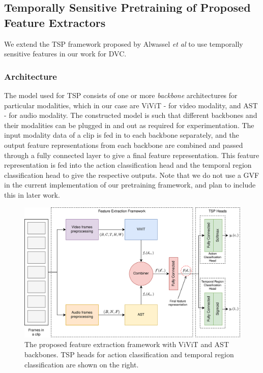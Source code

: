 \subsection{Temporally Sensitive Pretraining of Proposed Feature Extractors}

\par We extend the TSP framework proposed by Alwassel \textit{et al} \cite{alwassel2021tsp} to use temporally sensitive features in our work for DVC.

\subsubsection{Architecture} The model used for TSP consists of one or more \textit{backbone} architectures for particular modalities, which in our case are ViViT - for video modality, and AST - for audio modality. The constructed model is such that different backbones and their modalities can be plugged in and out as required for experimentation. The input modality data of a clip is fed in to each backbone separately, and the output feature representations from each backbone are combined and passed through a fully connected layer to give a final feature representation. This feature representation is fed into the action classification head and the temporal region classification head to give the respective outputs. Note that we do not use a GVF in the current implementation of our pretraining framework, and plan to include this in later work.

\begin{figure}
\centering
\includegraphics[width=\linewidth]{assets/img/tsp/tsp-arch.png}
\caption{The proposed feature extraction framework with ViViT and AST backbones. TSP heads for action classification and temporal region classification are shown on the right.}
\label{fig:tsp-arch}
\end{figure}

